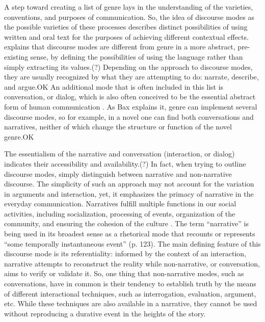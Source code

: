 \documentclass[12pt]{turabian-researchpaper}
\begin{document}
A step toward creating a list of genre lays in the understanding of the varieties, conventions, and purposes of communication. So, the idea of discourse modes as the possible varieties of these processes describes distinct possibilities of using written and oral text for the purposes of achieving different contextual effects. \textcite[p. 54]{bax2011} explains that discourse modes are different from genre in a more abstract, pre-existing sense, by defining the possibilities of using the language rather than simply extracting its values.(?) Depending on the approach to discourse modes, they are usually recognized by what they are attempting to do: narrate, describe, and argue.OK An additional mode that is often included in this list is conversation, or dialog, which is also often conceived to be the essential abstract form of human communication \parencite{bakhtin1986, bax2011}. As Bax explains it, genre can implement several discourse modes, so for example, in a novel one can find both conversations and narratives, neither of which change the structure or function of the novel genre.OK 

The essentialism of the narrative and conversation (interaction, or dialog) indicates their accessibility and availability.(?) In fact, when trying to outline discourse modes, \textcite{georgakopolou2000} simply distinguish between narrative and non-narrative discourse. The simplicity of such an approach may not account for the variation in arguments and interaction, yet, it emphasizes the primacy of narrative in the everyday communication. Narratives fulfill multiple functions in our social activities, including socialization, processing of events, organization of the community, and ensuring the cohesion of the culture \parencite{georgakopolou2000}. The term ``narrative'' is being used in its broadest sense as a rhetorical mode that recounts or represents ``some temporally instantaneous event'' (p. 123). The main defining feature of this discourse mode is its referentiality: informed by the context of an interaction, narrative attempts to reconstruct the reality while non-narrative, or conversation, aims to verify or validate it. So, one thing that non-narrative modes, such as conversations, have in common is their tendency to establish truth by the means of different interactional techniques, such as interrogation, evaluation, argument, etc. While these techniques are also available in a narrative, they cannot be used without reproducing a durative event in the heights of the story. 
\end{document}
